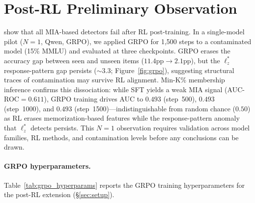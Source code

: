 \section{Post-RL Preliminary Observation}
\label{app:post_rl}

\citet{wang2025fragility} show that all MIA-based detectors fail after RL post-training.
In a single-model pilot ($N{=}1$, Qwen, GRPO), we applied GRPO \citep{shao2024} for 1,500 steps to a contaminated model (15\% MMLU) and evaluated at three checkpoints.
GRPO erases the accuracy gap between seen and unseen items ($11.4\text{pp} \to 2.1\text{pp}$), but the $\ell_z^*$ response-pattern gap persists (${\sim}3.3$; Figure~\ref{fig:grpo}), suggesting structural traces of contamination may survive RL alignment.
Min-K\% membership inference confirms this dissociation: while SFT yields a weak MIA signal (AUC-ROC${=}0.611$), GRPO training drives AUC to $0.493$ (step~500), $0.493$ (step~1000), and $0.493$ (step~1500)---indistinguishable from random chance ($0.50$) as RL erases memorization-based features while the response-pattern anomaly that $\ell_z^*$ detects persists.
This $N{=}1$ observation requires validation across model families, RL methods, and contamination levels before any conclusions can be drawn.

\paragraph{GRPO hyperparameters.}
Table~\ref{tab:grpo_hyperparams} reports the GRPO training hyperparameters for the post-RL extension (\S\ref{sec:setup}).

\begin{table}[t]
\centering
\caption{GRPO training hyperparameters (Qwen2.5-7B-Instruct, 15\% MMLU contamination).}
\label{tab:grpo_hyperparams}
\footnotesize
{}
\end{table}

